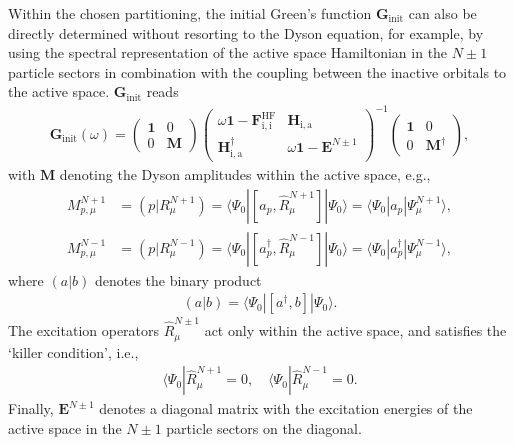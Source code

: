 \documentclass[aip,jcp,reprint,noshowkeys,superscriptaddress]{revtex4-1}
\newcommand{\bG}{\boldsymbol{G}}
\newcommand{\bH}{\boldsymbol{H}}
\newcommand{\bM}{\boldsymbol{M}}
\newcommand{\bE}{\boldsymbol{E}}
\begin{document}
Within the chosen partitioning, the initial Green's function $\bG_{\text{init}}$ can also be directly determined without resorting to the Dyson equation, for example, by using the spectral representation of the active space Hamiltonian in the $N\pm1$ particle sectors in combination with the coupling between the inactive orbitals to the active space. 
$\bG_{\text{init}}$ reads
\begin{align}
\bG_{\text{init}}(\omega) = 
\begin{pmatrix}
  \mathbf{1} & 0 \\
  0 & \bM
\end{pmatrix}
\begin{pmatrix}
  \omega \mathbf{1} - \mathbf{F}^\mathrm{HF}_\mathrm{i,i} & \bH_\mathrm{i, a}\\
   \bH^\dagger_\mathrm{i, a} & \omega \mathbf{1} - \bE^{N \pm 1}
\end{pmatrix}^{-1}
\begin{pmatrix}
  \mathbf{1} & 0 \\
  0 & \bM^\dagger
\end{pmatrix},
\label{eq:Ginit}
\end{align}
with $\bM$ denoting the Dyson amplitudes within the active space, e.g.,
\begin{align}
  M^{N+1}_{p,\mu} &= \left( p | R^{N+1}_\mu \right) = \langle \Psi_0 | \left[ a_p, \hat{R}^{N+1}_\mu \right] | \Psi_0 \rangle = \langle \Psi_0 | a_p | \Psi_\mu^{N+1} \rangle, \nonumber \\
  M^{N-1}_{p,\mu} &= \left( p | R^{N-1}_\mu \right) = \langle \Psi_0 | \left[ a_p^\dagger, \hat{R}^{N-1}_\mu \right] | \Psi_0 \rangle = \langle \Psi_0 | a_p^\dagger | \Psi_\mu^{N-1} \rangle,  \nonumber
\end{align}
where $\left( a | b \right)$ denotes the binary product 
\begin{align}
  \left( a | b \right) = \langle \Psi_0 | \left[ a^\dagger,  b \right] | \Psi_0 \rangle.
  \label{eq:binary-product}
\end{align}
The excitation operators $\hat{R}^{N\pm1}_\mu$ act only within the active space, and satisfies the `killer condition', i.e.,
\begin{align}
  \langle \Psi_0 | \hat{R}^{N+1}_\mu  = 0, \quad  \langle \Psi_0 | \hat{R}^{N-1}_\mu = 0.
\end{align}
Finally, $\bE^{N \pm 1}$ denotes a diagonal matrix with the excitation energies of the active space in the $N\pm1$ particle sectors on the diagonal.
\end{document}
